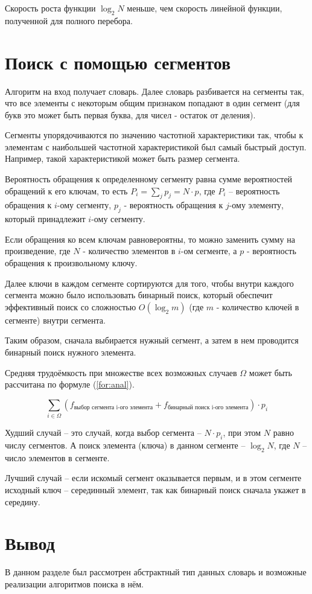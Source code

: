 Скорость роста функции $\log_2 N$ меньше, чем скорость линейной функции, полученной для полного перебора.

\section{Поиск с помощью сегментов}
Алгоритм на вход получает словарь. Далее словарь разбивается на сегменты так, что все элементы с некоторым общим признаком попадают в один сегмент (для букв это может быть первая буква, для чисел - остаток от деления).

Сегменты упорядочиваются по значению частотной характеристики так, чтобы к элементам с наибольшей частотной характеристикой был самый быстрый доступ.
Например, такой характеристикой может быть размер сегмента.

Вероятность обращения к определенному сегменту равна сумме вероятностей обращений к его ключам, то есть $P_i = \sum_{j}p_j = N \cdot p$, где $P_i$ -- вероятность обращения к $i$-ому сегменту, $p_j$ - вероятность обращения к $j$-ому элементу, который принадлежит $i$-ому сегменту. 

Если обращения ко всем ключам равновероятны, то можно заменить сумму на произведение, где $N$ - количество элементов в $i$-ом сегменте, а $p$ - вероятность обращения к произвольному ключу.

Далее ключи в каждом сегменте сортируются для того, чтобы внутри каждого сегмента можно было использовать бинарный поиск, который обеспечит эффективный поиск со сложностью $O(\log_2 m)$ (где $m$ - количество ключей в сегменте) внутри сегмента.

Таким образом, сначала выбирается нужный сегмент, а затем в нем проводится бинарный поиск нужного элемента.

Средняя трудоёмкость при множестве всех возможных случаев $\Omega$ может быть рассчитана по формуле (\ref{for:anal}). 

\begin{equation}
\label{for:anal}
\sum_{i \in \Omega}{\left(f_{\text{выбор сегмента i-ого элемента}} + f_{\text{бинарный поиск i-ого элемента}}\right)} \cdot p_i
\end{equation}

Худший случай -- это случай, когда выбор сегмента -- $N \cdot p_i$, при этом $N$ равно числу сегментов. А поиск элемента (ключа) в данном сегменте -- $\log_2 N$, где $N$ -- число элементов в сегменте.

Лучший случай -- если искомый сегмент оказывается первым, и в этом сегменте исходный ключ -- серединный элемент, так как бинарный поиск сначала укажет в середину. 

\section{Вывод}
В данном разделе был рассмотрен абстрактный тип данных словарь и возможные реализации алгоритмов поиска в нём.
